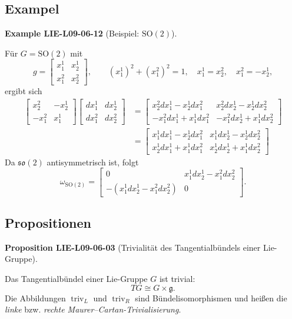 \documentclass[10pt, letterpaper]{article}
\newcommand{\SO}{\mathrm{SO}}
\newcommand{\CustomHeading}[3]{%
  \par\medskip\noindent%
  \textbf{#1 #2} \textnormal{(#3)}.\enskip%
}
\newenvironment{PROP}[2]{\CustomHeading{Proposition}{#1}{#2}}{}
\newenvironment{EXA}[2]{\CustomHeading{Example}{#1}{#2}}{}
\begin{document}
\subsection{Exampel}

\begin{EXA}{LIE-L09-06-12}{Beispiel: $\mathrm{SO}(2)$}
Für $G=\SO(2)$ mit
\[
g=
\begin{bmatrix}
x^1_1 & x^1_2\\
x^2_1 & x^2_2
\end{bmatrix},
\qquad
(x^1_1)^2+(x^2_1)^2=1,\quad x^1_1=x^2_2,\quad x^2_1=-x^1_2,
\]
ergibt sich
$$
\begin{aligned}
{\left[\begin{array}{cc}
x_{2}^{2} & -x_{2}^{1} \\
-x_{1}^{2} & x_{1}^{1}
\end{array}\right]\left[\begin{array}{cc}
d x_{1}^{1} & d x_{2}^{1} \\
d x_{1}^{2} & d x_{2}^{2}
\end{array}\right] } & =\left[\begin{array}{cc}
x_{2}^{2} d x_{1}^{1}-x_{2}^{1} d x_{1}^{2} & x_{2}^{2} d x_{2}^{1}-x_{2}^{1} d x_{2}^{2} \\
-x_{1}^{2} d x_{1}^{1}+x_{1}^{1} d x_{1}^{2} & -x_{1}^{2} d x_{2}^{1}+x_{1}^{1} d x_{2}^{2}
\end{array}\right] \\
& =\left[\begin{array}{cc}
x_{1}^{1} d x_{1}^{1}-x_{2}^{1} d x_{1}^{2} & x_{1}^{1} d x_{2}^{1}-x_{2}^{1} d x_{2}^{2} \\
x_{2}^{1} d x_{1}^{1}+x_{1}^{1} d x_{1}^{2} & x_{2}^{1} d x_{2}^{1}+x_{1}^{1} d x_{2}^{2}
\end{array}\right]
\end{aligned}
$$
Da $\mathfrak{so}(2)$ antisymmetrisch ist, folgt
\[
\omega_{\SO(2)}=
\begin{bmatrix}
0 & x^1_1dx^1_2-x^2_1dx^2_2\\[4pt]
-(x^1_1dx^1_2-x^2_1dx^2_2) & 0
\end{bmatrix}.
\]
\end{EXA}

\subsection{Propositionen}

\begin{PROP}{LIE-L09-06-03}{Trivialität des Tangentialbündels einer Lie-Gruppe}
Das Tangentialbündel einer Lie-Gruppe $G$ ist trivial:
\[
T G \cong G\times\mathfrak g.
\]
Die Abbildungen $\operatorname{triv}_L$ und $\operatorname{triv}_R$
sind Bündelisomorphismen und heißen die \emph{linke} bzw. \emph{rechte
Maurer--Cartan-Trivialisierung}.
\end{PROP}
\end{document}
